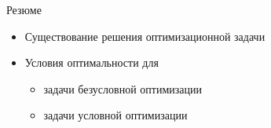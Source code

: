 \documentclass[12pt]{beamer}
\begin{document}

\begin{frame}{Резюме}
\begin{itemize}
\item Существование решения оптимизационной задачи 
\item Условия оптимальности для
\begin{itemize}
\item задачи безусловной оптимизации
\item задачи условной оптимизации
\end{itemize}
\end{itemize}
\end{frame}
\end{document}
